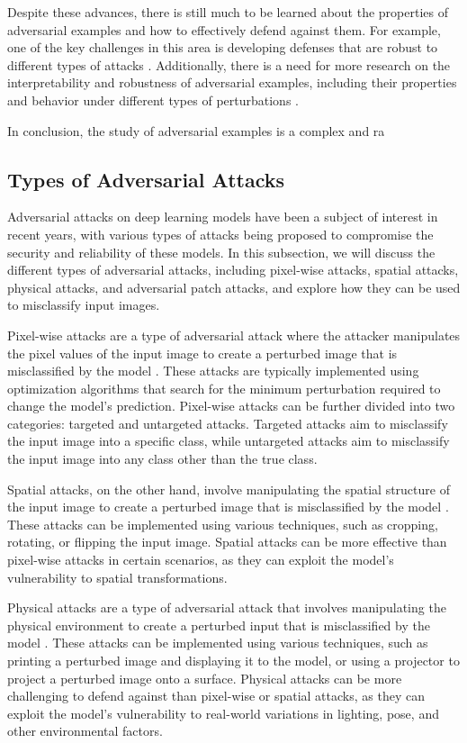 \documentclass[11pt]{article}
\begin{document}
Despite these advances, there is still much to be learned about the properties of adversarial examples and how to effectively defend against them. For example, one of the key challenges in this area is developing defenses that are robust to different types of attacks \cite{ref30}. Additionally, there is a need for more research on the interpretability and robustness of adversarial examples, including their properties and behavior under different types of perturbations \cite{ref23}.

In conclusion, the study of adversarial examples is a complex and ra

\subsection{Types of Adversarial Attacks}

Adversarial attacks on deep learning models have been a subject of interest in recent years, with various types of attacks being proposed to compromise the security and reliability of these models. In this subsection, we will discuss the different types of adversarial attacks, including pixel-wise attacks, spatial attacks, physical attacks, and adversarial patch attacks, and explore how they can be used to misclassify input images.

Pixel-wise attacks are a type of adversarial attack where the attacker manipulates the pixel values of the input image to create a perturbed image that is misclassified by the model \cite{ref3}. These attacks are typically implemented using optimization algorithms that search for the minimum perturbation required to change the model's prediction. Pixel-wise attacks can be further divided into two categories: targeted and untargeted attacks. Targeted attacks aim to misclassify the input image into a specific class, while untargeted attacks aim to misclassify the input image into any class other than the true class.

Spatial attacks, on the other hand, involve manipulating the spatial structure of the input image to create a perturbed image that is misclassified by the model \cite{ref33}. These attacks can be implemented using various techniques, such as cropping, rotating, or flipping the input image. Spatial attacks can be more effective than pixel-wise attacks in certain scenarios, as they can exploit the model's vulnerability to spatial transformations.

Physical attacks are a type of adversarial attack that involves manipulating the physical environment to create a perturbed input that is misclassified by the model \cite{ref34}. These attacks can be implemented using various techniques, such as printing a perturbed image and displaying it to the model, or using a projector to project a perturbed image onto a surface. Physical attacks can be more challenging to defend against than pixel-wise or spatial attacks, as they can exploit the model's vulnerability to real-world variations in lighting, pose, and other environmental factors.
\end{document}
